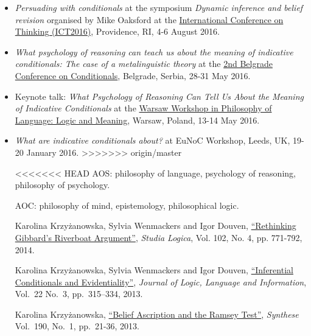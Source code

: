 \documentclass[11pt,article,oneside]{memoir}
\begin{document}
  \begin{itemize} 
  	\item \emph{Persuading with conditionals} at the symposium \emph{Dynamic inference and belief revision}  organised by Mike Oaksford at the \href{http://sites.clps.brown.edu/ict2016/}{International Conference on Thinking (ICT2016)}, Providence, RI, 4-6 August 2016. 


    \item \emph{What psychology of reasoning can teach us about the meaning of indicative conditionals: The case of a metalinguistic theory} at the \href{http://www.f.bg.ac.rs/fil-konf/konferencija2-home.html}{2nd Belgrade Conference on Conditionals}, Belgrade, Serbia, 28-31  May 2016.

    \item Keynote talk: \emph{What Psychology of Reasoning Can Tell Us About the Meaning of Indicative Conditionals} at the \href{http://logicalconnectives.uw.edu.pl/}{Warsaw Workshop in Philosophy of Language: Logic and Meaning}, Warsaw, Poland, 13-14 May 2016.

    \item \emph{What are indicative conditionals about?} at EuNoC Workshop, Leeds, UK, 19-20 January 2016.
>>>>>>> origin/master


<<<<<<< HEAD
\ind AOS: philosophy of language, psychology of reasoning, philosophy of psychology.

\ind AOC: philosophy of mind, epistemology, philosophical logic.

 \bigskip


\ind Karolina Krzyżanowska, Sylvia Wenmackers and Igor Douven,
\href{http://link.springer.com/article/10.1007/s11225-013-9507-2}{``Rethinking Gibbard's Riverboat Argument''}, \emph{Studia Logica}, Vol. 102, No. 4, pp. 771-792, 2014.

\ind Karolina Krzyżanowska, Sylvia Wenmackers and Igor Douven,
\href{http://link.springer.com/article/10.1007/s10849-013-9178-4}{``Inferential Conditionals and Evidentiality''}, 
 \emph{Journal of Logic, Language and Information}, Vol.~22 No.~3, pp.~315–334, 2013.

\ind Karolina Krzyżanowska, \href{http://link.springer.com/article/10.1007%2Fs11229-012-0160-5}{``Belief Ascription and the Ramsey Test''}, \emph{Synthese} Vol.~190, No.~1, pp.~21-36, 2013. 


\end{itemize}
\end{document}
